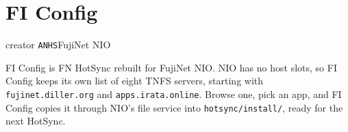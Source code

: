 \newpage
\section{FI Config}\label{app:ficonfig}
  {\fibadge\quad creator \texttt{ANHS}\quad FujiNet NIO}

FI Config is FN HotSync rebuilt for FujiNet NIO. NIO has no host slots, so
FI Config keeps its own list of eight TNFS servers, starting with
\texttt{fujinet.diller.org} and \texttt{apps.irata.online}. Browse one, pick
an app, and FI Config copies it through NIO's file service into
\texttt{hotsync/install/}, ready for the next HotSync.

\begin{center}
\hfill
{}\hfill
{}
\end{center}


